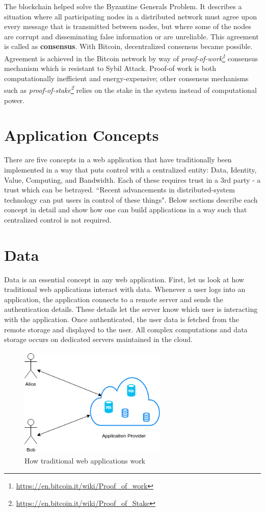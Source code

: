	The blockchain helped solve the Byzantine Generals Problem\cite{lamport1982byzantine}. It describes a situation where all participating nodes in a distributed network must agree upon every message that is transmitted between nodes, but where some of the nodes are corrupt and disseminating false information or are unreliable. This agreement is called as \textbf{consensus}. With Bitcoin\cite{nakamoto2008bitcoin}, decentralized consensus became possible. Agreement is achieved in the Bitcoin network by way of \textit{proof-of-work\footnote{\url{https://en.bitcoin.it/wiki/Proof_of_work}}} consensus mechanism which is resistant to Sybil Attack\cite{douceur2002sybil}. Proof-of work is both computationally inefficient and energy-expensive; other consensus mechanisms such as \textit{proof-of-stake\footnote{\url{https://en.bitcoin.it/wiki/Proof_of_Stake}}} relies on the stake in the system instead of computational power.
	
\section{Application Concepts}
	There are five concepts in a web application that have traditionally been implemented in a way that puts control with a centralized entity: Data, Identity, Value, Computing, and Bandwidth\cite{raval2016decentralized}. Each of these requires trust in a 3rd party - a trust which can be betrayed. ``Recent advancements in distributed-system technology can put users in control of these things"\cite{raval2016decentralized}. Below sections describe each concept in detail and show how one can build applications in a way such that centralized control is not required.

\section{Data}
	Data is an essential concept in any web application. First, let us look at how traditional web applications interact with data. Whenever a user logs into an application, the application connects to a remote server and sends the authentication details. These details let the server know which user is interacting with the application. Once authenticated, the user data is fetched from the remote storage and displayed to the user. All complex computations and data storage occurs on dedicated servers maintained in the cloud.
	
	\begin{figure}[h]
		\centering
		\includegraphics[width=200pt, height=150pt]{figures/traditional-app}
		\caption{\label{fig:traditional-app} How traditional web applications work}
	\end{figure}
	
